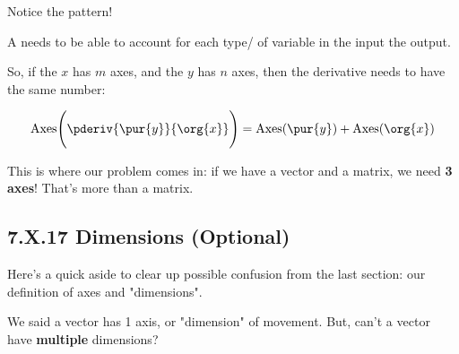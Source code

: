         Notice the pattern!\\
        
        \begin{concept}
            A  needs to be able to account for each type/ of variable in the input  the output.
            
            So, if the  $x$ has $m$ axes, and the  $y$ has $n$ axes, then the derivative needs to have the same  number:
            
            \begin{equation}
                \text{Axes}
                \Bigg(
                    \pderiv{\pur{y}}{\org{x}}
                \Bigg) 
                = 
                \text{Axes}(\pur{y}) + \text{Axes}(\org{x})
            \end{equation}
        \end{concept}
        
        This is where our problem comes in: if we have a vector and a matrix, we need \textbf{3 axes}! That's more than a matrix.
    
    \secdiv
    
    \subsection*{7.X.17 \quad Dimensions (Optional)}
        \label{7.X.17}
    
        Here's a quick aside to clear up possible confusion from the last section: our definition of axes and "dimensions".
        
        We said a vector has 1 axis, or "dimension" of movement. But, can't a vector have \textbf{multiple} dimensions?\\
        
